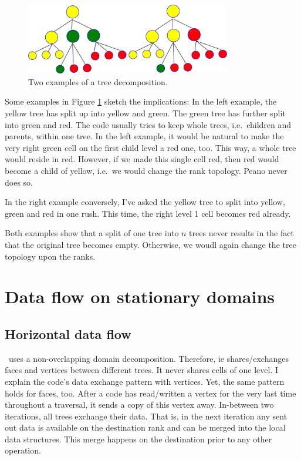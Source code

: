 \begin{figure}
  \begin{center}
    \includegraphics[width=0.8\textwidth]{51_domain-decomposition/tree-topology.pdf}
  \end{center}
  \caption{
    Two examples of a tree decomposition.
    \label{figure:51_domain-decomposition:tree-topology}
  }
\end{figure}

Some examples in Figure \ref{figure:51_domain-decomposition:tree-topology}
sketch the implications:
In the left example, the yellow tree has split up into yellow and green. The
green tree has further split into green and red.
The code usually tries to keep whole trees, i.e.~children and parents, within
one tree.
In the left example, it would be natural to make the very right green cell on
the first child level a red one, too.
This way, a whole tree would reside in red.
However, if we made this single cell red, then red would become a child of
yellow, i.e.~we would change the rank topology.
Peano never does so.

In the right example conversely, I've asked the yellow tree to split into
yellow, green and red in one rush. 
This time, the right level 1 cell becomes red already. 

Both examples show that a split of one tree into $n$ trees never
results in the fact that the original tree becomes empty.
Otherwise, we woudl again change the tree topology upon the ranks.


\section{Data flow on stationary domains}

\subsection{Horizontal data flow}

\Peano\ uses a non-overlapping domain decomposition.
Therefore, ie shares/exchanges faces and vertices between different trees.
It never shares cells of one level.
I explain the code's data exchange pattern with vertices.
Yet, the same pattern holds for faces, too.
After a code has read/written a vertex for the very last time throughout a
traversal, it sends a copy of this vertex away.
In-between two iterations, all trees exchange their data.
That is, in the next iteration any sent out data is available on the destination
rank and can be merged into the local data structures.
This merge happens on the destination prior to any other operation.


